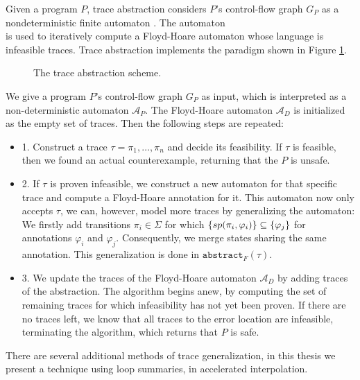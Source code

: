 Given a program $P$, trace abstraction considers $P$'s control-flow graph $G_P$ as a nondeterministic finite automaton . The automaton \\  is used to iteratively compute a Floyd-Hoare automaton  whose language is infeasible traces. Trace abstraction implements the paradigm shown in Figure \ref{traceAbstractionScheme}.

\begin{figure}[H]
	\centering
	
	\caption{The trace abstraction scheme.}
	\label{traceAbstractionScheme}
\end{figure}

We give a program $P$'s control-flow graph $G_P$  as input, which is interpreted as a non-deterministic automaton $\mathcal{A}_P$. The Floyd-Hoare automaton $\mathcal{A}_D$ is initialized as the empty set of traces. Then the following steps are repeated: 
\begin{itemize}
	\item 1. Construct a trace $\tau = \pi_1, \ldots, \pi_n$ and decide its feasibility. If $\tau$ is feasible, then we found an actual counterexample, returning that the $P$ is unsafe.
	\item 2. If $\tau$ is proven infeasible, we construct a new automaton for that specific trace and compute a Floyd-Hoare annotation for it. This automaton now only accepts $\tau$, we can, however, model more traces by generalizing the automaton: We firstly add transitions $\pi_i \in \Sigma$ for which $\{sp(\pi_i, \varphi_i)\} \subseteq \{\varphi_j\}$ for annotations $\varphi_i$ and $\varphi_j$. Consequently, we merge states sharing the same annotation. This generalization is done in $\texttt{abstract}_F(\tau)$.
	\item 3. We update the traces of the Floyd-Hoare automaton $\mathcal{A}_D$ by adding traces of the abstraction. The algorithm begins anew, by computing the set of remaining traces for which infeasibility has not yet been proven. If there are no traces left, we know that all traces to the error location are infeasible, terminating the algorithm, which returns that $P$ is safe.
\end{itemize}
There are several additional methods of trace generalization, in this thesis we present a technique using loop summaries, in accelerated interpolation. \\ \par

